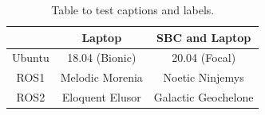 



%


\begin{table}[h!]
\centering
\begin{tabular}{c |c| c}
                &   Laptop              &   SBC and Laptop  \\
    \hline
    Ubuntu      &   18.04 (Bionic)      &   20.04 (Focal)   \\
    \hline
    ROS1        &   Melodic Morenia     &   Noetic Ninjemys \\  
    \hline
    ROS2        &   Eloquent Elusor     &   Galactic Geochelone\\
\end{tabular}
\caption{Table to test captions and labels.}
\label{table:1}
\end{table}
